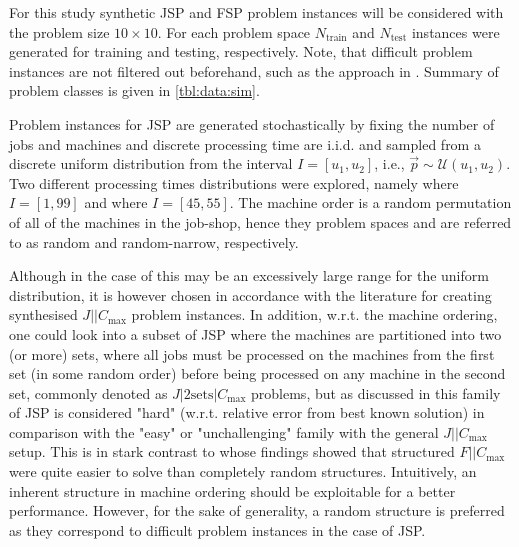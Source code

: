 \documentclass[smallextended]{svjour3}
\begin{document}
	
	
		
	For this study synthetic JSP and FSP problem instances will be considered with the problem size $10\times10$. 
	For each problem space $N_{\text{train}}$  and $N_{\text{test}}$ instances were generated for training and testing, respectively. 
	Note, that difficult problem instances are not filtered out beforehand, such as the approach in \citet{Whitley}. 
	Summary of problem classes is given in \cref{tbl:data:sim}.  
	
	Problem instances for JSP are generated stochastically by fixing the number of jobs and machines and 
	discrete processing time are i.i.d. and sampled from a discrete uniform distribution from the interval $I=[u_1,u_2]$, i.e., $\vec{p}\sim \mathcal{U}(u_1,u_2)$. 
	Two different processing times distributions were explored, namely 
	  where $I=[1,99]$ and   where $I=[45,55]$.
	The machine order is a random permutation of all of the machines in the job-shop, hence they problem spaces    and   are referred to as random and random-narrow, respectively. 
	
	Although in the case of   this may be an excessively large range for the uniform distribution, it is however chosen in accordance with the literature \citep{Demirkol98} for creating synthesised $J||C_{\max}$ problem instances. In addition, w.r.t. the machine ordering, one could look into a subset of JSP where the machines are partitioned into two (or more) sets, where all jobs must be processed on the machines from the first set (in some random order) before being processed on any machine in the second set, commonly denoted as $J|2\textrm{sets}|C_{\max}$ problems, but as discussed in \cite{orlib_swv} this family of JSP is considered "hard" (w.r.t. relative error from best known solution) in comparison with the "easy" or "unchallenging" family with the general $J||C_{\max}$ setup. %
	This is in stark contrast to \citet{Whitley} whose findings showed that structured $F||C_{\max}$ were quite easier to solve than completely random structures. 
	Intuitively, an inherent structure in machine ordering should be exploitable for a better performance.  However, for the sake of generality, a random structure is preferred as they correspond to difficult problem instances in the case of JSP. 
	
\end{document}
